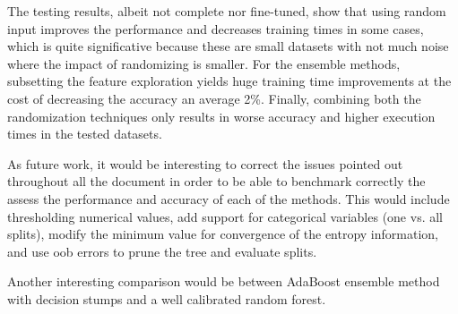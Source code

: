 \documentclass[a4paper,10pt]{article}
\begin{document}
The testing results, albeit not complete nor fine-tuned, show that using random input improves the performance and decreases training times in some cases, which is quite significative because these are small datasets with not much noise where the impact of randomizing is smaller. For the ensemble methods, subsetting the feature exploration yields huge training time improvements at the cost of decreasing the accuracy an average 2\%. Finally, combining both the randomization techniques only results in worse accuracy and higher execution times in the tested datasets.

As future work, it would be interesting to correct the issues pointed out throughout all the document in order to be able to benchmark correctly the assess the performance and accuracy of each of the methods. This would include thresholding numerical values, add support for categorical variables (one vs. all splits), modify the minimum value for convergence of the entropy information, and use oob errors to prune the tree and evaluate splits. 

Another interesting comparison would be between AdaBoost ensemble method with decision stumps and a well calibrated random forest. 

% 

 

\end{document}
